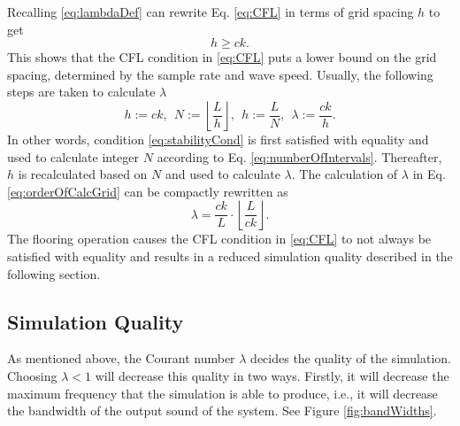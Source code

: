 Recalling \eqref{eq:lambdaDef} can rewrite Eq. \eqref{eq:CFL} in terms of grid spacing $h$ to get
\begin{equation}\label{eq:stabilityCond}
    h \geq ck.
\end{equation}
This shows that the CFL condition in \eqref{eq:CFL} puts a lower bound on the grid spacing, determined by the sample rate and wave speed. Usually, the following steps are taken to calculate $\lambda$
\begin{equation}\label{eq:orderOfCalcGrid}
    h := ck,\ \ N := \left\lfloor\frac{L}{h}\right\rfloor, \ \ h := \frac{L}{N}, \ \ \lambda := \frac{ck}{h}.
\end{equation}
In other words, condition \eqref{eq:stabilityCond} is first satisfied with equality and used to calculate integer $N$ according to Eq. \eqref{eq:numberOfIntervals}. Thereafter, $h$ is recalculated based on $N$ and used to calculate $\lambda$. The calculation of $\lambda$ in Eq. \eqref{eq:orderOfCalcGrid} can be compactly rewritten as
\begin{equation}\label{eq:compactLambda}
    \lambda = \frac{ck}{L}\cdot\left\lfloor\frac{L}{ck}\right\rfloor.
\end{equation}
The flooring operation causes the CFL condition in \eqref{eq:CFL} to not always be satisfied with equality and results in a reduced simulation quality described in the following section.

\subsection{Simulation Quality}\label{sec:quality}
As mentioned above, the Courant number $\lambda$ decides the quality of the simulation. Choosing $\lambda < 1$ will decrease this quality in two ways. Firstly, it will decrease the maximum frequency that the simulation is able to produce, i.e., it will decrease the bandwidth of the output sound of the system. See Figure \ref{fig:bandWidths}.


